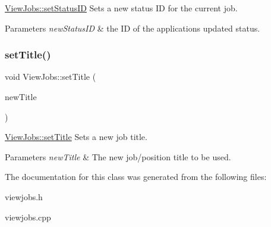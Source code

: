 \hyperlink{class_view_jobs_a55943415fd91377d5f701f7074ba58d6}{View\+Jobs\+::set\+Status\+ID} Sets a new status ID for the current job. 


\begin{DoxyParams}{Parameters}
{\em new\+Status\+ID} & the ID of the application\textquotesingle{}s updated status. \\
\hline
\end{DoxyParams}
\mbox{\label{class_view_jobs_abfe1969197cde57ea049c1b7d91cd4f5}} 
\subsubsection{\texorpdfstring{set\+Title()}{setTitle()}}
{\footnotesize\ttfamily void View\+Jobs\+::set\+Title (\begin{DoxyParamCaption}\item[{Q\+String}]{new\+Title }\end{DoxyParamCaption})}



\hyperlink{class_view_jobs_abfe1969197cde57ea049c1b7d91cd4f5}{View\+Jobs\+::set\+Title} Sets a new job title. 


\begin{DoxyParams}{Parameters}
{\em new\+Title} & The new job/position title to be used. \\
\hline
\end{DoxyParams}


The documentation for this class was generated from the following files\+:\begin{DoxyCompactItemize}
\item 
viewjobs.\+h\item 
viewjobs.\+cpp\end{DoxyCompactItemize}
